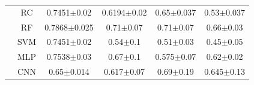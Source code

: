 \begin{table}[h]
\begin{tabular}{c c cccc}
     & RC & \multicolumn{1}{c}{0.7451$\pm$0.02} & \multicolumn{1}{c}{0.6194$\pm$0.02} & \multicolumn{1}{c}{0.65$\pm$0.037} & 0.53$\pm$0.037\\
    & RF & \multicolumn{1}{c}{0.7868$\pm$0.025} & \multicolumn{1}{c}{0.71$\pm$0.07} & \multicolumn{1}{c}{0.71$\pm$0.07} & 0.66$\pm$0.03\\
   
    & SVM & \multicolumn{1}{c}{0.7451$\pm$0.02} & \multicolumn{1}{c}{0.54$\pm$0.1} & \multicolumn{1}{c}{0.51$\pm$0.03} & 0.45$\pm$0.05\\
    & MLP & \multicolumn{1}{c}{0.7538$\pm$0.03} & \multicolumn{1}{c}{0.67$\pm$0.1} & \multicolumn{1}{c}{0.575$\pm$0.07} & 0.62$\pm$0.02\\
    & CNN & \multicolumn{1}{c}{0.65$\pm$0.014} & \multicolumn{1}{c}{0.617$\pm$0.07} & \multicolumn{1}{c}{0.69$\pm$0.19} & 0.645$\pm$0.13\\
    
        \bottomrule
    \end{tabular}
\end{table}

